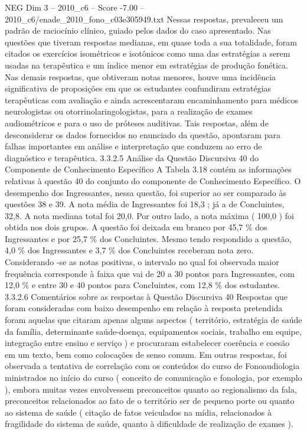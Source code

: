 \begin{textsample}{NEG Dim 3 – 2010\_c6 – Score -7.00 – 2010\_c6/enade\_2010\_fono\_c03e305949.txt}
Nessas respostas, prevaleceu um padrão de raciocínio clínico, guiado pelos dados do caso apresentado.
Nas questões que tiveram respostas medianas, em quase toda a sua totalidade, foram citados os exercícios isométricos e isotônicos como uma das estratégias a serem usadas na terapêutica e um índice menor em estratégias de produção fonética.
Nas demais respostas, que obtiveram notas menores, houve uma incidência significativa de proposições em que os estudantes confundiram estratégias terapêuticas com avaliação e ainda acrescentaram encaminhamento para médicos neurologistas ou otorrinolaringologistas, para a realização de exames audiométricos e para o uso de próteses auditivas.
Tais respostas, além de desconsiderar os dados fornecidos no enunciado da questão, apontaram para falhas importantes em análise e interpretação que conduzem ao erro de diagnóstico e terapêutica. 3.3.2.5 Análise da Questão Discursiva 40 do Componente de Conhecimento Específico A Tabela 3.18 contém as informações relativas à questão 40 do conjunto do componente de Conhecimento Específico.
O desempenho dos Ingressantes, nessa questão, foi superior ao ser comparado às questões 38 e 39.
A nota média de Ingressantes foi 18,3 ; já a de Concluintes, 32,8.
A nota mediana total foi 20,0.
Por outro lado, a nota máxima ( 100,0 ) foi obtida nos dois grupos.
A questão foi deixada em branco por 45,7 \% dos Ingressantes e por 25,7 \% dos Concluintes.
Mesmo tendo respondido a questão, 4,0 \% dos Ingressantes e 3,7 \% dos Concluintes receberam nota zero.
Considerando -se as notas positivas, o intervalo no qual foi observada maior frequência corresponde à faixa que vai de 20 a 30 pontos para Ingressantes, com 12,0 \% e entre 30 e 40 pontos para Concluintes, com 12,8 \% dos estudantes. 3.3.2.6 Comentários sobre as respostas à Questão Discursiva 40 Respostas que foram consideradas com baixo desempenho em relação à resposta pretendida foram aquelas que citaram apenas alguns aspectos ( território, estratégia de saúde da família, determinante saúde-doença, equipamentos sociais, trabalho em equipe, integração entre ensino e serviço ) e procuraram estabelecer coerência e coesão em um texto, bem como colocações de senso comum.
Em outras respostas, foi observada a tentativa de correlação com os conteúdos do curso de Fonoaudiologia ministrados no início do curso ( conceito de comunicação e fonologia, por exemplo ), embora muitas vezes envolvessem preconceitos quanto ao regionalismo da fala, preconceitos relacionados ao fato de o território ser de pequeno porte ou quanto ao sistema de saúde ( citação de fatos veiculados na mídia, relacionados à fragilidade do sistema de saúde, quanto à dificuldade de realização de exames ).

\end{textsample}
